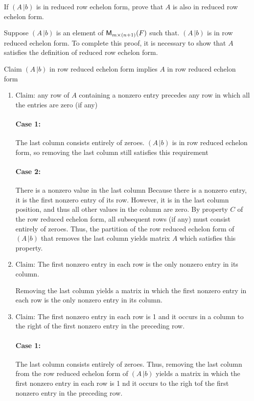 If $(A\, | b)$ is in reduced row echelon form, prove that $A$ is
also in reduced row echelon form.

Suppose $(A\,|b)$ is an element of $\mathsf{M}_{m \times (n+1)}(F)$ such that. $(A\,|b)$ is in row reduced echelon form.  To
complete this proof, it is necessary to show that $A$ satisfies the
definition of reduced row echelon form.

Claim $(A\,|b)$ in row reduced echelon form implies $A$ in row reduced echelon form

\begin{enumerate}
\item Claim: any row of $A$ containing a nonzero entry precedes any row in
which all the entries are zero (if any)
\paragraph{Case 1:} The last column consists entirely of zeroes.
$(A\,|b)$ is in row reduced echelon form, so removing the last column still satisfies this
requirement

\paragraph{Case 2:} There is a nonzero value in the last column
Because there is a nonzero entry, it is the first nonzero entry of its
row.  However, it is in the last column position, and thus all other values in
the column are zero.  By property $C$ of the row reduced echelon form, all subsequent rows (if any)
must consist entirely of zeroes. 
Thus, the partition of the row reduced
echelon form of $(A\,|b)$ that
removes the last column yields matrix $A$ which satisfies this property.

\item Claim: The first nonzero entry in each row is the only nonzero entry in
its column. 

Removing the last column yields a matrix in which the first nonzero entry
in each row is the only nonzero entry in its column.

\item Claim:  The first nonzero entry in each row is 1 and it occurs in a
column to the right of the first nonzero entry in the preceding row.

\paragraph{Case 1:} The last column consists entirely of zeroes.
Thus, removing the last column from the row reduced echelon form of $(A\,|b)$ yields a matrix in which the
first nonzero entry in each row is 1 nd it occurs to the righ tof the
first nonzero entry in the preceding row.


\end{enumerate}
